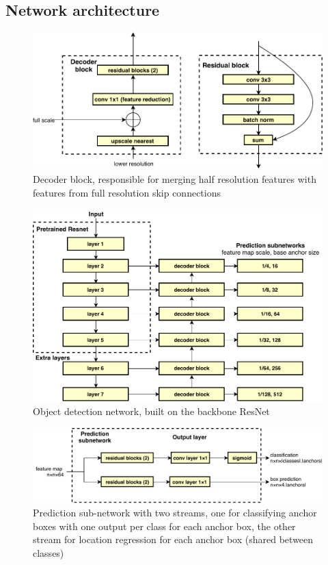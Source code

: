 \subsection {Network architecture}
\label{sec:architecture}


\begin{figure}[htb!]
  \centering
  \includegraphics[width=1.0\linewidth]{figures/annotation/decoder_block.pdf}
  \caption{Decoder block, responsible for merging half resolution features with features from full resolution skip connections }  
  \label{fig:decoder_block}
\end{figure}


\begin{figure}[htb!]
  \centering
  \includegraphics[width=1.0\linewidth]{figures/annotation/detection_network.pdf}
  \caption{Object detection network, built on the backbone ResNet }  
  \label{fig:detection_network}
\end{figure}

\begin{figure}[htb!]
  \centering
  \includegraphics[width=1.0\linewidth]{figures/annotation/prediction_subnet.pdf}
  \caption{Prediction sub-network with two streams, one for classifying anchor boxes with one output per class for each anchor box, the other stream for location regression for each anchor box (shared between classes)}    
  \label{fig:prediction_subnet}  
\end{figure}


